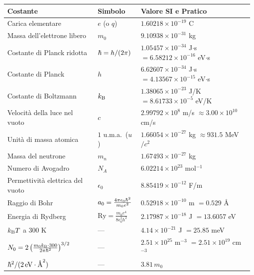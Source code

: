 \vspace{0.3cm}
\begin{table}[htpb]
\centering
\renewcommand{\arraystretch}{1.2}
{\small
\begin{tabular}{l l l}
\toprule
\textbf{Costante} & \textbf{Simbolo} & \textbf{Valore SI e Pratico} \\
\midrule
Carica elementare & $e$ (o $q$) & $1.60218\times10^{-19}$ C \\
Massa dell'elettrone libero & $m_0$ & $9.10938\times10^{-31}$ kg \\
Costante di Planck ridotta & $\hbar = h/(2\pi)$ & $1.05457\times10^{-34}$ J$\cdot$s $= 6.58212\times10^{-16}$ eV$\cdot$s \\
Costante di Planck & $h$ & $6.62607\times10^{-34}$ J$\cdot$s $= 4.13567\times10^{-15}$ eV$\cdot$s \\
Costante di Boltzmann & $k_{\mathrm{B}}$ & $1.38065\times10^{-23}$ J/K $= 8.61733\times10^{-5}$ eV/K \\
Velocità della luce nel vuoto & $c$ & $2.99792\times10^{8}$ m/s $\approx 3.00\times10^{10}$ cm/s \\
Unità di massa atomica & $1$ u.m.a.\ ($u$) & $1.66054\times10^{-27}$ kg $\approx 931.5$ MeV$/c^2$ \\
Massa del neutrone & $m_n$ & $1.67493\times10^{-27}$ kg \\
Numero di Avogadro & $N_A$ & $6.02214\times10^{23}$ mol$^{-1}$ \\
Permettività elettrica del vuoto & $\epsilon_0$ & $8.85419\times10^{-12}$ F/m \\
Raggio di Bohr & $a_0 = \frac{4\pi\epsilon_0\hbar^2}{m_0e^2}$ & $0.52918\times10^{-10}$ m $= 0.529$ \AA \\
Energia di Rydberg & $\text{Ry} = \frac{m_0e^4}{8\epsilon_0^2h^2}$ & $2.17987\times10^{-18}$ J $= 13.6057$ eV \\
$k_{\mathrm{B}} T$ a 300 K & --- & $4.14\times10^{-21}$ J $= 25.85$ meV \\
$N_0 = 2\left(\frac{m_0k_{\mathrm{B}}\cdot300}{2\pi\hbar^2}\right)^{3/2}$ & --- & $2.51\times10^{25}$ m$^{-3}$ $= 2.51\times10^{19}$ cm$^{-3}$ \\
$\hbar^2/(2\,\text{eV}\cdot\text{\AA}^2)$ & --- & $3.81\,m_0$ \\
\bottomrule
\end{tabular}}
\end{table}

